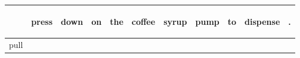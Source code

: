 \documentclass[landscape]{article}
\newcommand{\ssp}{\hspace{2pt}}
\begin{document}
\noindent\begin{tabular}{|l|p{10pt}|p{10pt}|p{10pt}|p{10pt}|p{10pt}|p{10pt}|p{10pt}|p{10pt}|p{10pt}|p{10pt}|}
\hline
&\begin{sideways}\cellcolor{ref0}press\hspace{12pt}\end{sideways}&\begin{sideways}\cellcolor{ref1}down\hspace{12pt}\end{sideways}&\begin{sideways}\cellcolor{ref2}on\hspace{12pt}\end{sideways}&\begin{sideways}\cellcolor{ref3}the\hspace{12pt}\end{sideways}&\begin{sideways}\cellcolor{ref4}coffee\hspace{12pt}\end{sideways}&\begin{sideways}\cellcolor{ref5}syrup\hspace{12pt}\end{sideways}&\begin{sideways}\cellcolor{ref6}pump\hspace{12pt}\end{sideways}&\begin{sideways}\cellcolor{ref7}to\hspace{12pt}\end{sideways}&\begin{sideways}\cellcolor{ref8}dispense\hspace{12pt}\end{sideways}&\begin{sideways}\cellcolor{ref9}.\hspace{12pt}\end{sideways}\\
\hline
\ssp pull \ssp&\hspace{2pt}&\hspace{2pt}&\hspace{2pt}&\hspace{2pt}&\hspace{2pt}&\hspace{2pt}&\hspace{2pt}&\hspace{2pt}&\hspace{2pt}&\hspace{2pt}\\

\end{tabular}
\end{document}
